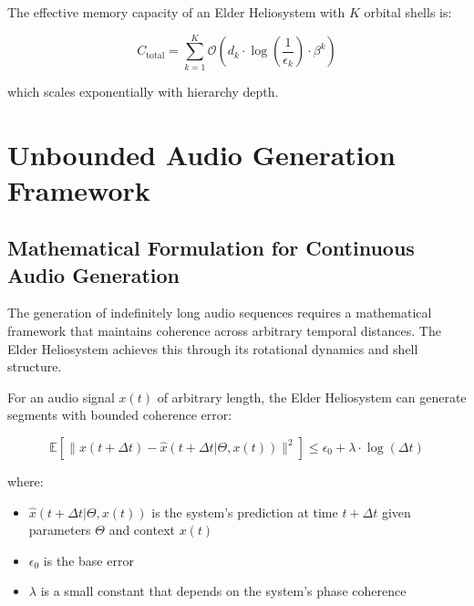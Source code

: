 \begin{theorem}
The effective memory capacity of an Elder Heliosystem with $K$ orbital shells is:

\begin{equation}
C_{\text{total}} = \sum_{k=1}^K \mathcal{O}(d_k \cdot \log(\frac{1}{\epsilon_k}) \cdot \beta^k)
\end{equation}

which scales exponentially with hierarchy depth.
\end{theorem}

\section{Unbounded Audio Generation Framework}

\subsection{Mathematical Formulation for Continuous Audio Generation}

The generation of indefinitely long audio sequences requires a mathematical framework that maintains coherence across arbitrary temporal distances. The Elder Heliosystem achieves this through its rotational dynamics and shell structure.

\begin{theorem}
For an audio signal $x(t)$ of arbitrary length, the Elder Heliosystem can generate segments with bounded coherence error:

\begin{equation}
\mathbb{E}[\|x(t+\Delta t) - \hat{x}(t+\Delta t|\Theta, x(t))\|^2] \leq \epsilon_0 + \lambda \cdot \log(\Delta t)
\end{equation}

where:
\begin{itemize}
    \item $\hat{x}(t+\Delta t|\Theta, x(t))$ is the system's prediction at time $t+\Delta t$ given parameters $\Theta$ and context $x(t)$
    \item $\epsilon_0$ is the base error
    \item $\lambda$ is a small constant that depends on the system's phase coherence
\end{itemize}
\end{theorem}

